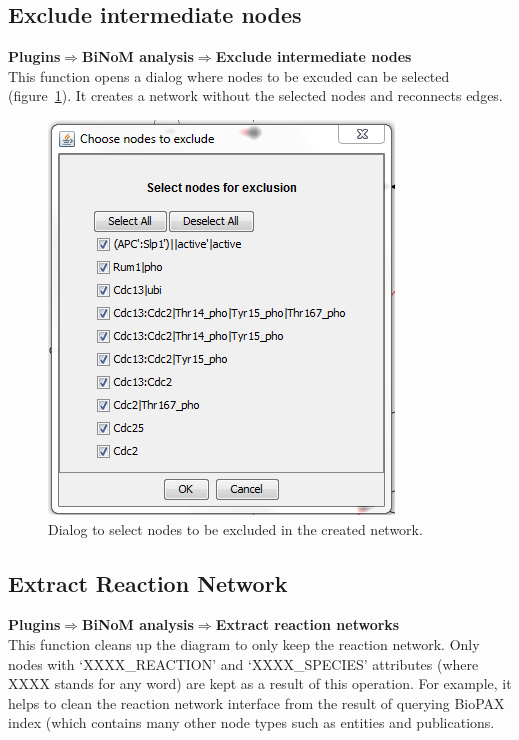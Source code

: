 \subsection{Exclude intermediate nodes}
\textbf{Plugins$\Rightarrow$BiNoM analysis$\Rightarrow$Exclude intermediate nodes}\\
This function opens a dialog where nodes to be excuded can be selected (figure~\ref{Exclude_nodes_Dialog}). It creates a network without the selected nodes and reconnects edges.
\begin{figure}
\centering
\includegraphics[width=7 cm]{graphics/Exclude_nodes_Dialog}
\caption{Dialog to select nodes to be excluded in the created network.}
\label{Exclude_nodes_Dialog}
\end{figure}

\subsection{Extract Reaction Network}
\textbf{Plugins$\Rightarrow$BiNoM analysis$\Rightarrow$Extract reaction networks}\\
This function cleans up the diagram to only keep the reaction network. Only nodes with ‘XXXX\_REACTION’ and ‘XXXX\_SPECIES’ attributes (where XXXX stands for any word) are kept as a result of this operation. For example, it helps to clean the reaction network interface from the result of querying BioPAX index (which contains many other node types such as entities and publications.

